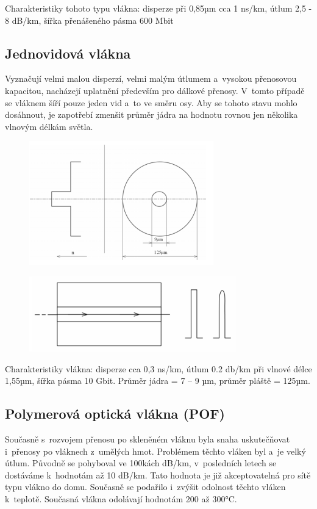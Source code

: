 Charakteristiky tohoto typu vlákna: disperze při 0,85µm cca 1 ns/km, útlum 2,5 - 8 dB/km, šířka přenášeného pásma 600 Mbit


\subsection{Jednovidová vlákna}
Vyznačují velmi malou disperzí, velmi malým útlumem a~vysokou přenosovou kapacitou, nacházejí uplatnění především pro dálkové přenosy. V~tomto případě se vláknem šíří pouze jeden vid a~to ve směru osy. Aby se tohoto stavu mohlo dosáhnout, je zapotřebí zmenšit průměr jádra na hodnotu rovnou jen několika vlnovým délkám světla. \newpage

\begin{figure}[!ht]
  \begin{center}
    \includegraphics[scale=1]{obrazky/jednovid.png}
  \end{center}
\end{figure}

\begin{figure}[!ht]
  \begin{center}
    \includegraphics[scale=1]{obrazky/sirjed.png}
  \end{center}
\end{figure}

Charakteristiky vlákna: disperze cca 0,3 ns/km, útlum 0.2 db/km při vlnové délce 1,55µm, šířka pásma 10 Gbit. Průměr jádra = 7 – 9 µm, průměr pláště = 125µm.

\subsection{Polymerová optická vlákna (POF)}
Současně s~rozvojem přenosu po skleněném vláknu byla snaha uskutečňovat i~přenosy po vláknech z~umělých hmot. Problémem těchto vláken byl a~je velký útlum. Původně se pohyboval ve 100kách dB/km, v~posledních letech se dostáváme k~hodnotám až 10 dB/km. Tato hodnota je již akceptovatelná pro sítě typu vlákno do domu. Současně se podařilo i~zvýšit odolnost těchto vláken k~teplotě. Současná vlákna odolávají hodnotám 200 až 300°C.

